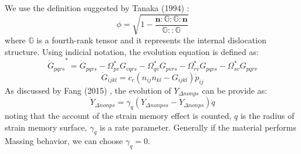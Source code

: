 We use the definition suggested by Tanaka (1994) \cite{tanaka1994nonproportionality}:
\begin{equation}
\phi  = \sqrt {1 - \frac{{{\mathbf{n}}:\mathbb{G}:\mathbb{G}:{\mathbf{n}}}}{{\mathbb{G}::\mathbb{G}}}}
\end{equation}
where $\mathbb{G}$ is a fourth-rank tensor and it represents the internal dislocation structure.
Using indicial notation, the evolution equation is defined as:
\begin{equation}
{\mathring G _{pqrs}}^* = {{\dot G}_{pqrs}} - \Omega _{pv}^*{G_{vqrs}} - \Omega _{qv}^*{G_{pvrs}} - \Omega _{rv}^*{G_{pqvs}} - \Omega _{sv}^*{G_{pqrv}}
\end{equation}
\begin{equation}
{{\dot G}_{ijkl}} = {c_c}\left( {{n_{ij}}{n_{kl}} - {G_{ijkl}}} \right){{\dot p}_{ij}}
\end{equation}
As discussed by Fang (2015) \cite{fang2015cyclic}, the evolution of ${Y_{\Delta nonps}}$ can be provide as:
\begin{equation}
{\dot Y_{\Delta nonps}} = {\gamma _q}\left( {{Y_{\Delta nonpss}} - {Y_{\Delta nonps}}} \right)\dot q
\end{equation}
noting that the account of the strain memory effect is counted, $q$ is the radius of strain memory surface, ${\gamma _q}$ is a rate parameter.
Generally if the material performs Massing behavior, we can choose ${\gamma _q}=0$.

